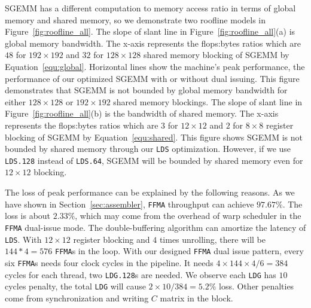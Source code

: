 SGEMM has a different computation to memory access ratio in terms of global memory and shared memory, so we demonstrate
two roofline models in Figure~\ref{fig:roofline_all}. %
The slope of slant line in Figure~\ref{fig:roofline_all}(a) is global memory bandwidth. 
The x-axis represents the flops:bytes ratios which are $48$ for $192\times192$ and $32$ for $128\times128$ shared memory blocking of SGEMM by Equation~\ref{equ:global}.
Horizontal lines
show the machine's peak performance, the performance of our optimized SGEMM with or without dual issuing.
This figure demonstrates that SGEMM is not bounded by global memory bandwidth
for either $128\times128$ or $192\times 192$ shared memory blockings.
The slope of slant line in Figure~\ref{fig:roofline_all}(b) is the bandwidth of shared memory. 
The x-axis represents the flops:bytes ratios which are $3$ for $12\times12$ and $2$ for $8\times8$ register blocking of SGEMM by Equation~\ref{equ:shared}.
This figure shows SGEMM is not bounded by shared memory through our {\tt LDS} optimization. 
However, if we use {\tt LDS.128} instead of {\tt LDS.64}, SGEMM will be bounded by shared memory even for $12\times 12$ blocking.

The loss of peak performance can be explained by the following reasons. As we have shown in 
Section~\ref{sec:assembler}, {\tt FFMA} throughput can achieve $97.67\%$. 
The loss is about $2.33\%$, which may come 
from the overhead of warp scheduler in the {\tt FFMA} dual-issue mode. The double-buffering algorithm can amortize the latency 
of {\tt LDS}.
With $12\times12$ register blocking and $4$ times unrolling, there will be $144*4=576$ {\tt FFMA}s in the loop.
With our designed {\tt FFMA} dual issue pattern, every six {\tt FFMA}s needs four clock cycles in the pipeline.
It needs $4\times144\times4/6=384$ cycles for each thread, two {\tt LDG.128}s are needed.
We observe each {\tt LDG} has $10$ cycles penalty, the total {\tt LDG} will cause $2\times10/384 = 5.2\%$ loss. Other
penalties come from synchronization and writing $C$ matrix in the block.

